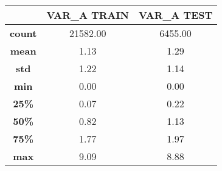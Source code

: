 \begin{tabular}{ccc}
\toprule
{} &  VAR\_A TRAIN &  VAR\_A TEST \\
\midrule
\textbf{count} &     21582.00 &     6455.00 \\
\textbf{mean } &         1.13 &        1.29 \\
\textbf{std  } &         1.22 &        1.14 \\
\textbf{min  } &         0.00 &        0.00 \\
\textbf{25\%  } &         0.07 &        0.22 \\
\textbf{50\%  } &         0.82 &        1.13 \\
\textbf{75\%  } &         1.77 &        1.97 \\
\textbf{max  } &         9.09 &        8.88 \\
\bottomrule
\end{tabular}
